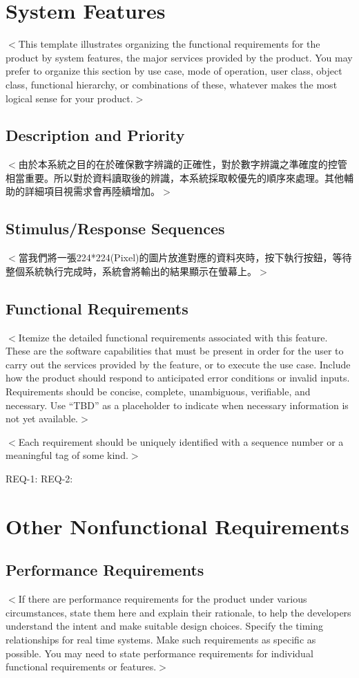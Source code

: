 \documentclass{scrreprt}
\begin{document}
\begin{CJK*}{UTF8}{bsmi}
\chapter{System Features}
$<$This template illustrates organizing the functional requirements for the 
product by system features, the major services provided by the product. You may 
prefer to organize this section by use case, mode of operation, user class, 
object class, functional hierarchy, or combinations of these, whatever makes the 
most logical sense for your product.$>$


\section{Description and Priority}
$<$由於本系統之目的在於確保數字辨識的正確性，對於數字辨識之準確度的控管相當重要。所以對於資料讀取後的辨識，本系統採取較優先的順序來處理。其他輔助的詳細項目視需求會再陸續增加。$>$

\section{Stimulus/Response Sequences}
$<$當我們將一張224*224(Pixel)的圖片放進對應的資料夾時，按下執行按鈕，等待整個系統執行完成時，系統會將輸出的結果顯示在螢幕上。$>$

\section{Functional Requirements}
$<$Itemize the detailed functional requirements associated with this feature.  
These are the software capabilities that must be present in order for the user 
to carry out the services provided by the feature, or to execute the use case.  
Include how the product should respond to anticipated error conditions or 
invalid inputs. Requirements should be concise, complete, unambiguous, 
verifiable, and necessary. Use “TBD” as a placeholder to indicate when necessary 
information is not yet available.$>$

$<$Each requirement should be uniquely identified with a sequence number or a 
meaningful tag of some kind.$>$

REQ-1:	REQ-2:


\chapter{Other Nonfunctional Requirements}

\section{Performance Requirements}
$<$If there are performance requirements for the product under various 
circumstances, state them here and explain their rationale, to help the 
developers understand the intent and make suitable design choices. Specify the 
timing relationships for real time systems. Make such requirements as specific 
as possible. You may need to state performance requirements for individual 
functional requirements or features.$>$


\end{CJK*}
\end{document}
